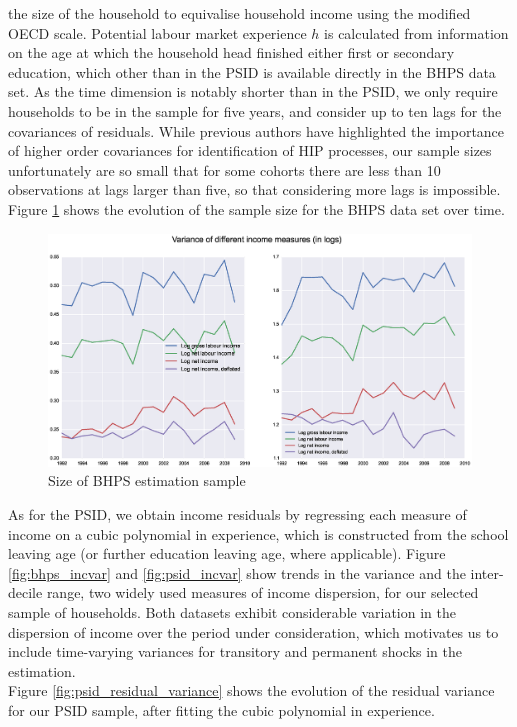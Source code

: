 the size of the household to equivalise household income using the modified 
OECD scale. 
Potential labour market experience $h$ is calculated from information on the age
at which the household head finished either first or secondary education, which
other than in the PSID is available directly in the BHPS data set. 
As the time dimension is notably 
shorter than in the PSID, we only require households to be in the sample 
for five years, and consider up to ten lags for the covariances of residuals. 
While previous authors have highlighted the importance of higher order covariances
for identification of HIP processes, our sample sizes unfortunately are so small
that for some cohorts there are less than 10 observations at lags larger than
five, so that considering more lags is impossible. Figure \ref{fig:BHPS_sample_size}
shows the evolution of the sample size for the BHPS data set over time.

\begin{figure}
\includegraphics[width=\columnwidth]{BHPS_incvar}
\caption{Size of BHPS estimation sample}
\label{fig:BHPS_sample_size}
\end{figure}


As for the PSID, we obtain
income residuals by regressing each measure of income on a cubic polynomial 
in experience, which is constructed from the school leaving age (or further
education leaving age, where applicable). Figure \ref{fig:bhps_incvar} and
\ref{fig:psid_incvar} show trends in the variance and the inter-decile range,
two widely used measures of income dispersion, for our selected sample of households.
Both datasets exhibit considerable variation in the dispersion of income over 
the period under consideration, which motivates us to include time-varying
variances for transitory and permanent shocks in the estimation. \\
Figure \ref{fig:psid_residual_variance} shows the evolution of the residual
variance for our PSID sample, after fitting the cubic polynomial in experience.

